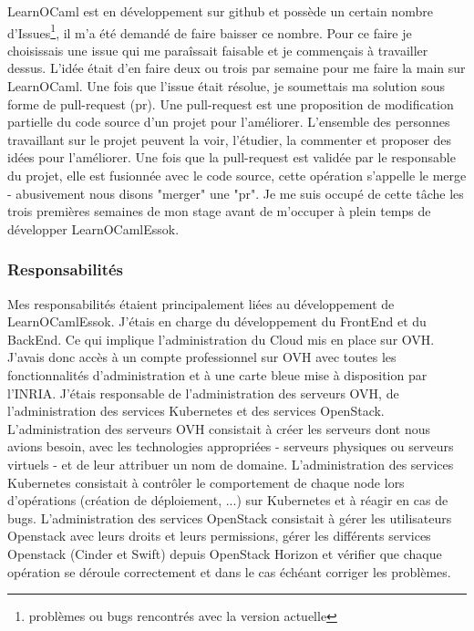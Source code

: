 \documentclass{article}
\begin{document}
LearnOCaml est en développement sur github et possède un certain nombre d'Issues\footnote{\label{Issues} problèmes ou bugs rencontrés avec la version actuelle}, il m'a été demandé de faire baisser ce nombre.
\newline
Pour ce faire je choisissais une issue qui me paraîssait faisable et je commençais à travailler dessus. L'idée était d'en faire deux ou trois par semaine pour me faire la main sur LearnOCaml.
\newline
Une fois que l'issue était résolue, je soumettais ma solution sous forme de pull-request (pr). Une pull-request est une proposition de modification partielle du code source d'un projet pour l'améliorer. L'ensemble des personnes travaillant sur le projet peuvent la voir, l'étudier, la commenter et proposer des idées pour l'améliorer. Une fois que la pull-request est validée par le responsable du projet, elle est fusionnée avec le code source, cette opération s'appelle le merge - abusivement nous disons "merger" une "pr".
\newline
Je me suis occupé de cette tâche les trois premières semaines de mon stage avant de m'occuper à plein temps de développer LearnOCamlEssok.

\subsubsection{Responsabilités}

Mes responsabilités étaient principalement liées au développement de LearnOCamlEssok. J'étais en charge du développement du FrontEnd et du BackEnd. Ce qui implique l'administration du Cloud mis en place sur OVH.
\newline
J'avais donc accès à un compte professionnel sur OVH avec toutes les fonctionnalités d'administration et à une carte bleue mise à disposition par l'INRIA. J'étais responsable de l'administration des serveurs OVH, de l'administration des services Kubernetes et des services OpenStack.
\newline
L'administration des serveurs OVH consistait à créer les serveurs dont nous avions besoin, avec les technologies appropriées - serveurs physiques ou serveurs virtuels - et de leur attribuer un nom de domaine.
\newline
L'administration des services Kubernetes consistait à contrôler le comportement de chaque node lors d'opérations (création de déploiement, ...) sur Kubernetes et à réagir en cas de bugs.
\newline
L'administration des services OpenStack consistait à gérer les utilisateurs Openstack avec leurs droits et leurs permissions, gérer les différents services Openstack (Cinder et Swift) depuis OpenStack Horizon et vérifier que chaque opération se déroule correctement et dans le cas échéant corriger les problèmes.
\end{document}
